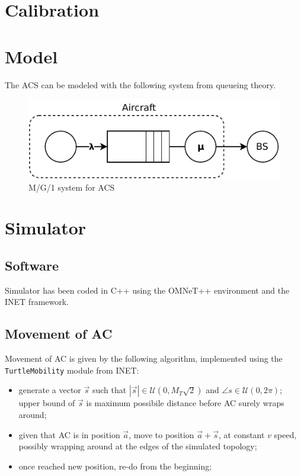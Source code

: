 \documentclass[a4paper,12pt]{article}
\begin{document}
\section{Calibration}




\section{Model}
The ACS can be modeled with the following system from queueing theory.

\begin{figure}[H]
  \centering
  \includegraphics{img/model.pdf}
  \caption{M/G/1 system for ACS}
  \label{fig:model}
\end{figure}

\section{Simulator}
\subsection{Software}
Simulator has been coded in C++ using the OMNeT++ environment and the INET framework.

\subsection{Movement of AC}
Movement of AC is given by the following algorithm, implemented using the \texttt{TurtleMobility} module from INET:
\begin{itemize}
  \item generate a vector $\vec{s}$ such that $|\vec{s}| \in \mathcal{U}(0, M_{T}\sqrt{2})$ and $\angle{s} \in \mathcal{U}(0, 2\pi)$; upper bound of $\vec{s}$ is maximum possibile distance before AC surely wraps around;
  \item given that AC is in position $\vec{a}$, move to position $\vec{a} + \vec{s}$, at constant $v$ speed, possibly wrapping around at the edges of the simulated topology;
  \item once reached new position, re-do from the beginning;
\end{itemize}
\end{document}
